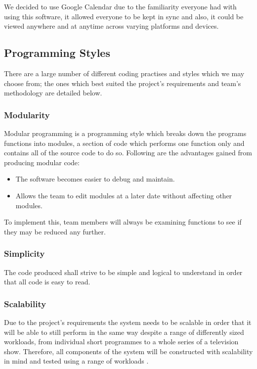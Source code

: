 We decided to use Google Calendar due to the familiarity everyone had with using this software, it allowed everyone to be kept in sync and also, it could be viewed anywhere and at anytime across varying platforms and devices.

\subsection{Programming Styles}
\label{sec:ProgrammingStyles}
There are a large number of different coding practises and styles which we may choose from; the ones which best suited the project’s requirements and team’s methodology are detailed below.

\subsubsection{Modularity}
\label{sec:Modularity}
Modular programming is a programming style which breaks down the programs functions into modules, a section of code which performs one 
function only and contains all of the source code to do so. Following are the advantages gained from producing modular code:

\begin{itemize}
	\item{The software becomes easier to debug and maintain.}
	\item{Allows the team to edit modules at a later date without affecting other modules.}
\end{itemize}

To implement this, team members will always be examining functions to see if they may be reduced any further.

\subsubsection{Simplicity}
The code produced shall strive to be simple and logical to understand in order that all code is easy to read. 

\subsubsection{Scalability}
Due to the project’s requirements the system needs to be scalable in order that it will be able to still perform in the same way despite a range of differently sized workloads, from individual short programmes to a whole series of a television show. Therefore, all components of the system will be constructed with scalability in mind and tested using a range of workloads \cite{citeScalability}.


